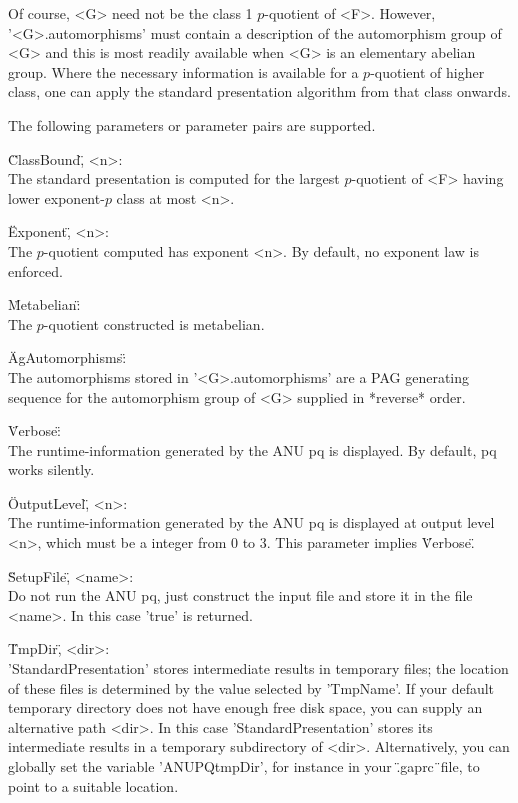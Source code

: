 Of  course, <G> need  not be the class  1 $p$-quotient of <F>.   However,
'<G>.automorphisms' must contain a description of the  automorphism group
of  <G>  and this is  most readily  available when  <G> is  an elementary
abelian  group.   Where the  necessary information  is  available  for  a
$p$-quotient of higher class,  one  can  apply  the standard presentation
algorithm from that class onwards.

The following parameters or parameter pairs are supported.

\"ClassBound\", <n>: \\
    The  standard presentation is  computed for  the largest $p$-quotient
    of <F> having lower exponent-$p$ class at most <n>.

\"Exponent\", <n>: \\
    The $p$-quotient computed has  exponent <n>.  By default, no exponent
    law is enforced.

\"Metabelian\": \\
    The $p$-quotient constructed is metabelian.

\"AgAutomorphisms\": \\
    The automorphisms stored in '<G>.automorphisms' are  a PAG generating
    sequence  for the automorphism group  of  <G>  supplied  in *reverse*
    order.

\"Verbose\": \\
    The  runtime-information generated by  the  ANU  pq is displayed.  By
    default, pq works silently.

\"OutputLevel\", <n>: \\
    The  runtime-information generated  by  the  ANU pq is  displayed  at
    output level  <n>, which  must  be  a integer  from  0  to  3.   This
    parameter implies \"Verbose\".

\"SetupFile\", <name>: \\
    Do not run the ANU pq, just construct the input file and  store it in
    the file <name>. In this case 'true' is returned.

\"TmpDir\", <dir>: \\
    'StandardPresentation'  stores  intermediate  results  in   temporary
    files;  the location  of  these  files  is  determined by  the  value
    selected by 'TmpName'.  If your default  temporary directory does not
    have enough  free  disk  space,  you  can supply an  alternative path
    <dir>.  In this case  'StandardPresentation' stores its  intermediate
    results in a temporary subdirectory of <dir>.  Alternatively, you can
    globally  set  the  variable  'ANUPQtmpDir',  for  instance  in  your
    \".gaprc\"\ file, to point to a suitable location.


